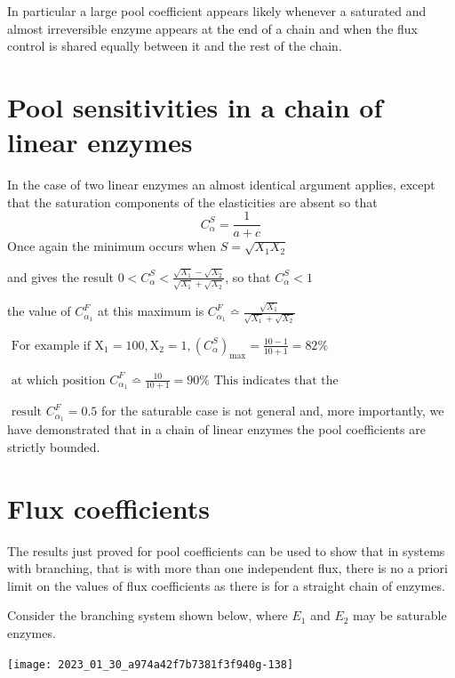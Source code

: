 In particular a large pool coefficient appears likely whenever a saturated and almost irreversible enzyme appears at the end of a chain and when the flux control is shared equally between it and the rest of the chain.

\section{Pool sensitivities in a chain of linear enzymes}

In the case of two linear enzymes an almost identical argument applies, except that the saturation components of the elasticities are absent so that
%
$$
C_{\alpha}^{S}=\frac{1}{a+c}
$$
%
Once again the minimum occurs when $S=\sqrt{X_{1} X_{2}}$

\medskip
and gives the result $0 < C_{\alpha}^{S}<\frac{\sqrt{X_{1}}-\sqrt{X_{2}}}{\sqrt{X_{1}}+\sqrt{X_{2}}}$, so that $C_{\alpha}^{S} < 1$

\medskip
the value of $C_{\alpha_{1}}^{F}$ at this maximum is $C_{\alpha_{1}}^{F} \bumpeq \frac{\sqrt{X_{1}}}{\sqrt{X_{1}}+\sqrt{X_{2}}}$

\medskip
$ \displaystyle \text { For example if } \mathrm{X}_{1}=100, \mathrm{X}_{2}=1,\left(C_{\alpha}^{S}\right)_{\max }=\frac{10 -1}{10+1}=82 \% $

\medskip
$ \displaystyle \text { at which position } C_{\alpha_{1}}^{F} \bumpeq \frac{10}{10+1}=90 \% \text { This indicates that the } $

\medskip
$ \displaystyle \text { result } C_{\alpha_{1}}^{F}=0.5 $  for the saturable case is not general and, more importantly, we have demonstrated that in a chain of linear enzymes the  pool coefficients are strictly bounded.


\section{Flux coefficients}

The results just proved for pool coefficients can be used to show that in systems with branching, that is with more than one independent flux, there is no a priori limit on the values of flux coefficients as there is for a straight chain of enzymes.

Consider the branching system shown below, where $E_{1}$ and $E_{2}$ may be saturable enzymes.

\begin{center}
\texttt{[image: 2023\_01\_30\_a974a42f7b7381f3f940g-138]}
\end{center}


